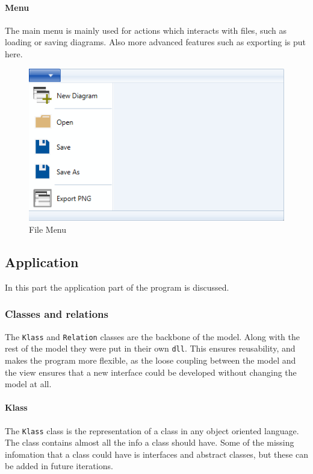 \paragraph{Menu}
The main menu is mainly used for actions which interacts with files, such as
loading or saving diagrams. Also more advanced features such as exporting is put
here.

\begin{figure}[H]
\centering
\includegraphics[width=\linewidth]{"img/file menu"}
\caption{File Menu \label{menu}}
\end{figure}

\subsection{Application}
In this part the application part of the program is discussed.

\subsubsection{Classes and relations}
The \texttt{Klass} and \texttt{Relation} classes are the backbone of the model.
Along with the rest of the model they were put in their own \texttt{dll}. This ensures reusability, and makes
the program more flexible, as the loose coupling between the model and the view
ensures that a new interface could be developed without changing the model at
all.

\paragraph{Klass}
The \texttt{Klass} class is the representation of a class in any object oriented
language. The class contains almost all the info a class should have. Some of
the missing infomation that a class could have is interfaces and abstract classes,
but these can be added in future iterations.

